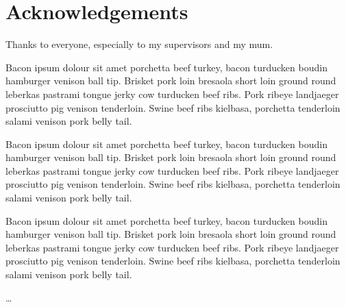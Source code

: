 
\chapter*{Acknowledgements}

Thanks to everyone, especially to my supervisors and my mum. 

Bacon ipsum dolour sit amet porchetta beef turkey, bacon turducken boudin hamburger venison ball tip. Brisket pork loin bresaola short loin ground round leberkas pastrami tongue jerky cow turducken beef ribs. Pork ribeye landjaeger prosciutto pig venison tenderloin. Swine beef ribs kielbasa, porchetta tenderloin salami venison pork belly tail.

Bacon ipsum dolour sit amet porchetta beef turkey, bacon turducken boudin hamburger venison ball tip. Brisket pork loin bresaola short loin ground round leberkas pastrami tongue jerky cow turducken beef ribs. Pork ribeye landjaeger prosciutto pig venison tenderloin. Swine beef ribs kielbasa, porchetta tenderloin salami venison pork belly tail.

Bacon ipsum dolour sit amet porchetta beef turkey, bacon turducken boudin hamburger venison ball tip. Brisket pork loin bresaola short loin ground round leberkas pastrami tongue jerky cow turducken beef ribs. Pork ribeye landjaeger prosciutto pig venison tenderloin. Swine beef ribs kielbasa, porchetta tenderloin salami venison pork belly tail.

\ldots



 